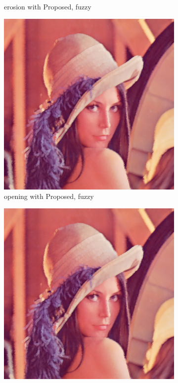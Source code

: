 \begin{figure}[!ht]
\begin{subfigure}[t]{0.22\textwidth}
    \caption{erosion with Proposed, fuzzy}
    \centering
  \end{subfigure}
\begin{subfigure}[t]{0.22\textwidth}
    \includegraphics[width=0.9\linewidth]{../project/images/outputs/compare_order/opening_Proposed_fuzzy.png}
    \caption{opening with Proposed, fuzzy}
    \centering
  \end{subfigure}
\begin{subfigure}[t]{0.22\textwidth}
    \includegraphics[width=0.9\linewidth]{../project/images/outputs/compare_order/closing_Proposed_fuzzy.png}

\end{subfigure}
\end{figure}

